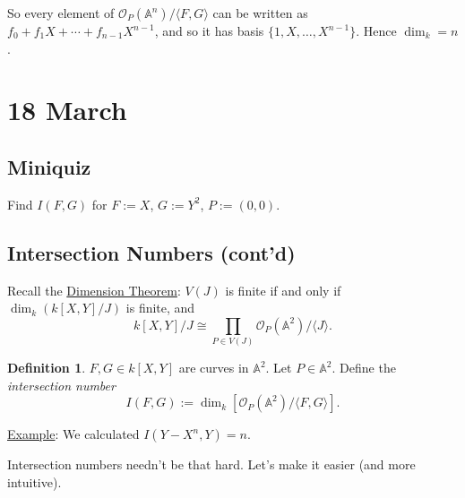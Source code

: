 \documentclass[12pt]{article}
\newcommand{\ita}[1]{\textit{#1}}
\newcommand{\vbrack}[1]{\langle #1\rangle}
\theoremstyle{definition}
\newtheorem{definition}[theorem]{Definition}
\begin{document}
So every element of $\mathcal{O}_P(\mathbb{A}^n)/\vbrack{F,G}$ can be written as $f_0+f_1X+\dotsb+f_{n-1}X^{n-1}$, and so it has basis $\{1,X,\dotsc,X^{n-1}\}$. Hence $\dim_k=n$.
\section{18 March}
\subsection{Miniquiz}
Find $I(F,G)$ for $F:=X$, $G:=Y^2$, $P:=(0,0)$.
\subsection{Intersection Numbers (cont'd)}
Recall the \underline{Dimension Theorem}: $V(J)$ is finite if and only if $\dim_k(k[X,Y]/J)$ is finite, and
\[k[X,Y]/J\cong\prod\limits_{P\in V(J)}\mathcal{O}_P(\mathbb{A}^2)/\vbrack{J}.\]
\begin{definition}
    $F,G\in k[X,Y]$ are curves in $\mathbb{A}^2$. Let $P\in\mathbb{A}^2$. Define the \ita{intersection number}
    \[I(F,G):=\dim_k[\mathcal{O}_P(\mathbb{A}^2)/\vbrack{F,G}].\]
\end{definition}
\underline{Example}: We calculated $I(Y-X^n,Y)=n$.

Intersection numbers needn't be that hard. Let's make it easier (and more intuitive).
\end{document}

